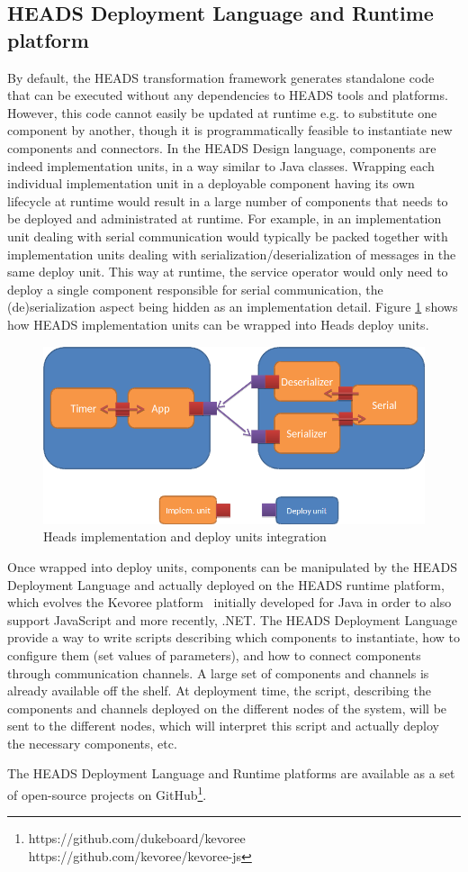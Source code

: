 \subsection{HEADS Deployment Language and Runtime platform}

By default, the HEADS transformation framework generates standalone code that can be executed without any dependencies to HEADS tools and platforms. However, this code cannot easily be updated at runtime e.g. to substitute one component by another, though it is programmatically feasible to instantiate new components and connectors. In the HEADS Design language, components are indeed implementation units, in a way similar to Java classes. Wrapping each individual implementation unit in a deployable component having its own lifecycle at runtime would result in a large number of components that needs to be deployed and administrated at runtime. For example, in an implementation unit dealing with serial communication would typically be packed together with implementation units dealing with serialization/deserialization of messages in the same deploy unit. This way at runtime, the service operator would only need to deploy a single component responsible for serial communication, the (de)serialization aspect being hidden as an implementation detail. Figure \ref{fig:fig2} shows how HEADS implementation units can be wrapped into Heads deploy units.


\begin{figure}[t]
	\centering
	\includegraphics[width=0.8\linewidth]{figures/fig2}
	\caption[Heads implementation and deploy units integration]{Heads implementation and deploy units integration}
	\label{fig:fig2}
\end{figure}

Once wrapped into deploy units, components can be manipulated by the HEADS Deployment Language and actually deployed on the HEADS runtime platform, which evolves the Kevoree platform~\cite{DBLP:conf/cbse/FouquetMFBPJ12} initially developed for Java in order to also support JavaScript and more recently, .NET. The HEADS Deployment Language provide a way to write scripts describing which components to instantiate, how to configure them (set values of parameters), and how to connect components through communication channels. A large set of components and channels is already available off the shelf. At deployment time, the script, describing the components and channels deployed on the different nodes of the system, will be sent to the different nodes, which will interpret this script and actually deploy the necessary components, etc.   

The HEADS Deployment Language and Runtime platforms are available as a set of open-source projects on GitHub\footnote{https://github.com/dukeboard/kevoree\\https://github.com/kevoree/kevoree-js}.
